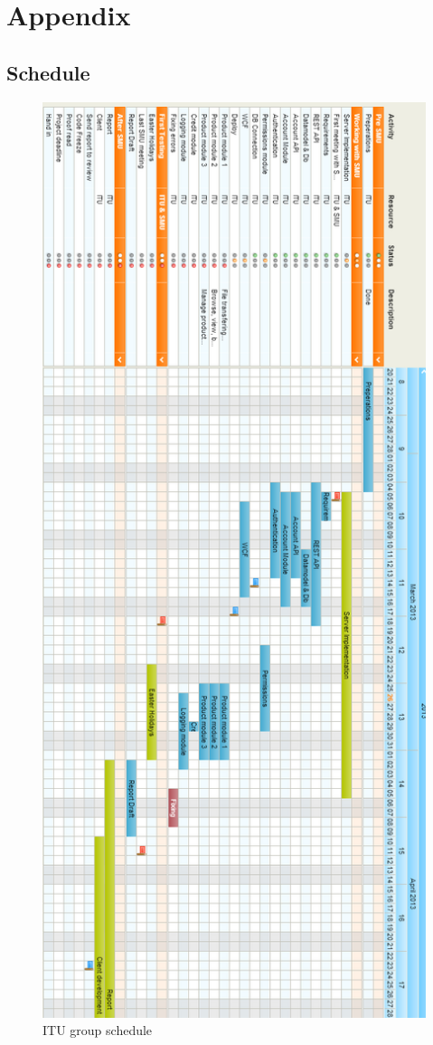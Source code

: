 \section*{Appendix}
\renewcommand*\thesubsection{\Roman{subsection}} %


\subsection{Schedule}
\label{schedule}
\begin{figure}[H]
\includegraphics[scale=0.5]{illustrations/ItuSchedule.png}
\caption{ITU group schedule}
\end{figure}
